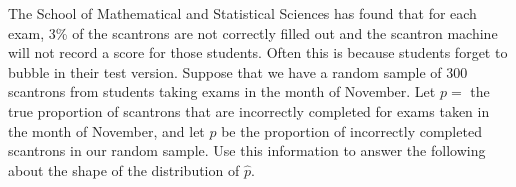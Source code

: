 \documentclass[noanswers]{exam}
\begin{document}
\begin{questions}
\begin{parts}
	\vspace{3mm}
	
\begin{choices}
	
	

\end{choices}	

\vspace{3mm}
		
\end{parts}

\question The School of Mathematical and Statistical Sciences has found that for each exam, 3\% of the scantrons are not correctly filled out and the scantron machine will not record a score for those students. Often this is because students forget to bubble in their test version. Suppose that we have a random sample of 300 scantrons from students taking exams in the month of November. Let $p=$ the true proportion of scantrons that are incorrectly completed for exams taken in the month of November, and let $\hat{p}$ be the proportion of incorrectly completed scantrons in our random sample. Use this information to answer the following about the shape of the distribution of $\hat{p}$. 

\vspace{3mm}

\end{questions}
\end{document}
